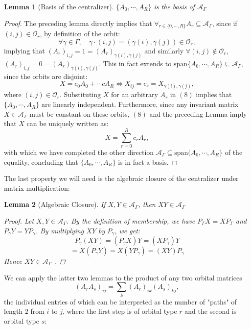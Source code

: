 \documentclass{article}
\theoremstyle{plain}
\newtheorem{lemma}{Lemma}[section]
\numberwithin{equation}{section}
\theoremstyle{definition}
\theoremstyle{remark}
\begin{document}
\begin{lemmaproofbox}
    \begin{lemma}[Basis of the centralizer]\label{lemma:basis}
    $\{A_0, \cdots, A_R\}$ is the basis of $\mathcal{A}_\Gamma$
        
    \end{lemma}
    \begin{proof} The preceding lemma directly implies that $\forall_{r\in \{0, \cdots, R\}}A_r\subseteq \mathcal{A}_\Gamma$, since if $(i, j)\in \mathcal{O}_r$, by definition of the orbit: $$\forall{\gamma\in \Gamma}, \quad \gamma\cdot (i, j) = (\gamma(i), \gamma(j))\in \mathcal{O}_r,$$ implying that $(A_r)_{i, j} = 1 = (A_r)_{\gamma(i), \gamma(j)}$ and similarly $\forall (i, j)\not\in \mathcal{O}_r$, $(A_r)_{i, j} = 0 = (A_r)_{\gamma(i), \gamma(j)}$. This in fact extends to $\text{span}\{A_0, \cdots, A_R\}\subseteq \mathcal{A}_\Gamma$, since the orbits are disjoint: 
    \begin{equation} X = c_0A_0+\cdots cA_R\Leftrightarrow X_{ij} = c_r=X_{\gamma(i), \gamma(j)},\end{equation}
where $(i,j)\in \mathcal{O}_r$. Substituting $X$ for an arbitrary $A_r$ in $(8)$ implies that  $\{A_0, \cdots, A_R\}$ are linearly independent. Furthermore, since any invariant matrix $X\in \mathcal{A}_\Gamma$ must be constant on these orbits, $(8)$ and the preceding Lemma imply that $X$ can be uniquely written as: $$X = \sum_{r=0}^R c_r A_r,$$
with which we have completed the other direction $\mathcal{A}_\Gamma\subseteq \text{span}(A_0, \cdots, A_R\}$ of the equality, concluding that $\{A_0, \cdots, A_R\}$ is in fact a basis. 
    \end{proof}
\end{lemmaproofbox}
\noindent The last property we will need is the algebraic closure of the centralizer under matrix multiplication: 
\begin{lemmaproofbox}
    
\begin{lemma}[Algebraic Closure] If $X, Y\in \mathcal{A}_\Gamma$, then $XY\in \mathcal{A}_\Gamma$

\begin{proof}
    Let $X, Y\in \mathcal{A}_\Gamma$. By the definition of membership, we have $P_\Gamma X = XP_\Gamma$ and $P_\gamma Y = Y P_\gamma$. By multiplying $XY$ by $P_\gamma$, we get: $$P_\gamma(XY) = (P_\gamma X)Y = (XP_\gamma)Y$$
    $$= X(P_\gamma Y) = X(YP_\gamma) = (XY)P_\gamma$$
	  Hence $XY\in \mathcal{A}_\Gamma$ . 
      \end{proof}
\end{lemma}
\end{lemmaproofbox}
\noindent We can apply the latter two lemmas to the product of any two orbital matrices $$(A_rA_s)_{ij} = \sum_k (A_r)_{ik}(A_s)_{kj},$$ the individual entries of which can be interpreted as the number of "paths" of length $2$ from $i$ to $j$, where the first step is of orbital type $r$ and the second is orbital type $s$:
\end{document}
